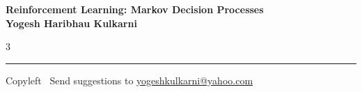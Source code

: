 \documentclass[8pt,landscape]{article}
\begin{document}
\footnotesize


\begin{center}
\Large{\textbf{Reinforcement Learning: Markov Decision Processes\\ Yogesh Haribhau Kulkarni}}
\end{center}

\begin{multicols}{3}

\end{multicols}

\rule{\linewidth}{0.25pt}
\scriptsize
Copyleft \textcopyleft\  Send suggestions to
\href{http://www.yogeshkulkarni.com}{yogeshkulkarni@yahoo.com}
\end{document}
